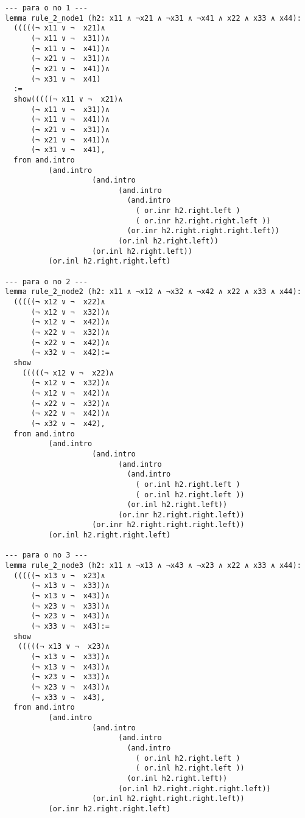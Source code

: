 \begin{enumerate}
\begin{lstlisting}
--- para o no 1 ---
lemma rule_2_node1 (h2: x11 ∧ ¬x21 ∧ ¬x31 ∧ ¬x41 ∧ x22 ∧ x33 ∧ x44):
  (((((¬ x11 ∨ ¬  x21)∧
      (¬ x11 ∨ ¬  x31))∧ 
      (¬ x11 ∨ ¬  x41))∧ 
      (¬ x21 ∨ ¬  x31))∧ 
      (¬ x21 ∨ ¬  x41))∧ 
      (¬ x31 ∨ ¬  x41)
  :=
  show(((((¬ x11 ∨ ¬  x21)∧
      (¬ x11 ∨ ¬  x31))∧ 
      (¬ x11 ∨ ¬  x41))∧ 
      (¬ x21 ∨ ¬  x31))∧ 
      (¬ x21 ∨ ¬  x41))∧ 
      (¬ x31 ∨ ¬  x41),
  from and.intro
          (and.intro
                    (and.intro
                          (and.intro
                            (and.intro
                              ( or.inr h2.right.left ) 
                              ( or.inr h2.right.right.left ))
                            (or.inr h2.right.right.right.left))
                          (or.inl h2.right.left))
                    (or.inl h2.right.left))
          (or.inl h2.right.right.left)

--- para o no 2 ---
lemma rule_2_node2 (h2: x11 ∧ ¬x12 ∧ ¬x32 ∧ ¬x42 ∧ x22 ∧ x33 ∧ x44):
  (((((¬ x12 ∨ ¬  x22)∧
      (¬ x12 ∨ ¬  x32))∧ 
      (¬ x12 ∨ ¬  x42))∧ 
      (¬ x22 ∨ ¬  x32))∧ 
      (¬ x22 ∨ ¬  x42))∧ 
      (¬ x32 ∨ ¬  x42):=
  show
    (((((¬ x12 ∨ ¬  x22)∧
      (¬ x12 ∨ ¬  x32))∧ 
      (¬ x12 ∨ ¬  x42))∧ 
      (¬ x22 ∨ ¬  x32))∧ 
      (¬ x22 ∨ ¬  x42))∧ 
      (¬ x32 ∨ ¬  x42),
  from and.intro
          (and.intro
                    (and.intro
                          (and.intro
                            (and.intro
                              ( or.inl h2.right.left ) 
                              ( or.inl h2.right.left ))
                            (or.inl h2.right.left))
                          (or.inr h2.right.right.left))
                    (or.inr h2.right.right.right.left))
          (or.inl h2.right.right.left)

--- para o no 3 ---
lemma rule_2_node3 (h2: x11 ∧ ¬x13 ∧ ¬x43 ∧ ¬x23 ∧ x22 ∧ x33 ∧ x44):
  (((((¬ x13 ∨ ¬  x23)∧
      (¬ x13 ∨ ¬  x33))∧ 
      (¬ x13 ∨ ¬  x43))∧ 
      (¬ x23 ∨ ¬  x33))∧ 
      (¬ x23 ∨ ¬  x43))∧ 
      (¬ x33 ∨ ¬  x43):=
  show
   (((((¬ x13 ∨ ¬  x23)∧
      (¬ x13 ∨ ¬  x33))∧ 
      (¬ x13 ∨ ¬  x43))∧ 
      (¬ x23 ∨ ¬  x33))∧ 
      (¬ x23 ∨ ¬  x43))∧ 
      (¬ x33 ∨ ¬  x43),
  from and.intro
          (and.intro
                    (and.intro
                          (and.intro
                            (and.intro
                              ( or.inl h2.right.left ) 
                              ( or.inl h2.right.left ))
                            (or.inl h2.right.left))
                          (or.inl h2.right.right.right.left))
                    (or.inl h2.right.right.right.left))
          (or.inr h2.right.right.left)


\end{lstlisting}
\end{enumerate}
